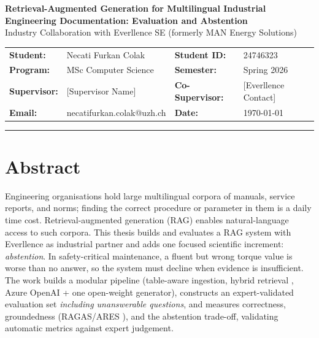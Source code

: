 \documentclass[10pt,a4paper]{article}
\begin{document}
\begin{center}
    {\large \textbf{Retrieval-Augmented Generation for Multilingual Industrial\\[0.1em]Engineering Documentation: Evaluation and Abstention}}\\[0.2em]
    {\small Industry Collaboration with Everllence SE (formerly MAN Energy Solutions)}
\end{center}

\vspace{0.2em}

\noindent
{\small
\begin{tabularx}{\textwidth}{>{\bfseries}l X >{\bfseries}l X}
Student: & Necati Furkan Colak & Student ID: & 24746323 \\
Program: & MSc Computer Science & Semester: & Spring 2026 \\
Supervisor: & [Supervisor Name] & Co-Supervisor: & [Everllence Contact] \\
Email: & necatifurkan.colak@uzh.ch & Date: & \today \\
\end{tabularx}}

\vspace{0.3em}
\hrule
\vspace{0.3em}

\section{Abstract}

Engineering organisations hold large multilingual corpora of manuals, service reports, and norms; finding the correct procedure or parameter in them is a daily time cost. Retrieval-augmented generation (RAG) \cite{lewis2020rag} enables natural-language access to such corpora. This thesis builds and evaluates a RAG system with Everllence as industrial partner and adds one focused scientific increment: \emph{abstention}. In safety-critical maintenance, a fluent but wrong torque value is worse than no answer, so the system must decline when evidence is insufficient. The work builds a modular pipeline (table-aware ingestion, hybrid retrieval \cite{robertson2009bm25, karpukhin2020dpr}, Azure OpenAI + one open-weight generator), constructs an expert-validated evaluation set \emph{including unanswerable questions}, and measures correctness, groundedness (RAGAS/ARES \cite{es2023ragas, saadfalcon2024ares}), and the abstention trade-off, validating automatic metrics against expert judgement.
\end{document}
